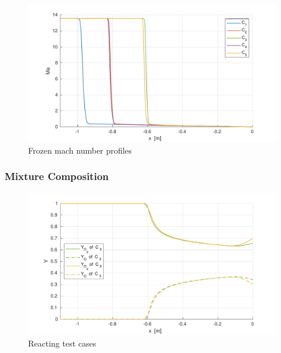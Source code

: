 \documentclass[10pt]{beamer}
\begin{document}
\begin{frame}
  \begin{figure}[ht]
    \centering
    \includegraphics[width=\textwidth]{stagnationLine/figures/mach.pdf}
    \caption{Frozen mach number profiles}
  \end{figure}
\end{frame}

\begin{frame}
  \frametitle{Mixture Composition}
  \begin{figure}[ht]
    \centering
    \includegraphics[width=\textwidth]{stagnationLine/figures/composition.pdf}
    \caption{Reacting test cases}
  \end{figure}
\end{frame}
\end{document}
